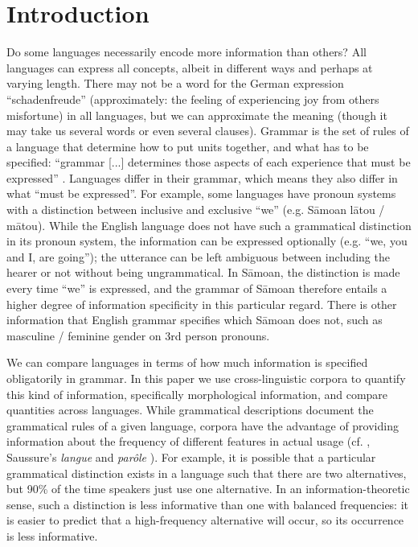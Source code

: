 \documentclass[USenglish]{article}
\begin{document}
\section{Introduction}
Do some languages necessarily encode more information than others?
All languages can express all concepts, albeit in different ways and perhaps at varying length. 
There may not be a word for the German expression ``schadenfreude'' (approximately: the feeling of experiencing joy from others misfortune) in all languages, but we can approximate the meaning (though it may take us several words or even several clauses). 
Grammar is the set of rules of a language that determine how to put units together, and what has to be specified: ``grammar [...] determines those aspects of each experience that must be expressed'' \citep[132]{boas1938language}. 
Languages differ in their grammar, which means they also differ in what ``must be expressed''. 
For example, some languages have pronoun systems with a distinction between inclusive and exclusive ``we'' (e.g. S\={a}moan l\={a}tou / m\={a}tou). 
While the English language does not have such a grammatical distinction in its pronoun system, the information can be expressed optionally (e.g. ``we, you and I, are going''); the utterance can be left ambiguous between including the hearer or not without being ungrammatical.
In S\={a}moan, the distinction is made every time ``we'' is expressed, and the grammar of S\={a}moan therefore entails a higher degree of information specificity in this particular regard.
There is other information that English grammar specifies which S\={a}moan does not, such as masculine / feminine gender on 3rd person pronouns.

We can compare languages in terms of how much information is specified obligatorily in grammar. 
In this paper we use cross-linguistic corpora to quantify this kind of information, specifically morphological information, and compare quantities across languages.
While grammatical descriptions document the grammatical rules of a given language, corpora have the advantage of providing information about the frequency of different features in actual usage (cf. \citet{levshina_gradient}, Saussure's \textit{langue} and \textit{parôle} \citet{Saussure1916}).
For example, it is possible that a particular grammatical distinction exists in a language such that there are two alternatives, but 90\% of the time speakers just use one alternative. 
In an information-theoretic sense, such a distinction is less informative than one with balanced frequencies: it is easier to predict that a high-frequency alternative will occur, so its occurrence is less informative.
\end{document}
